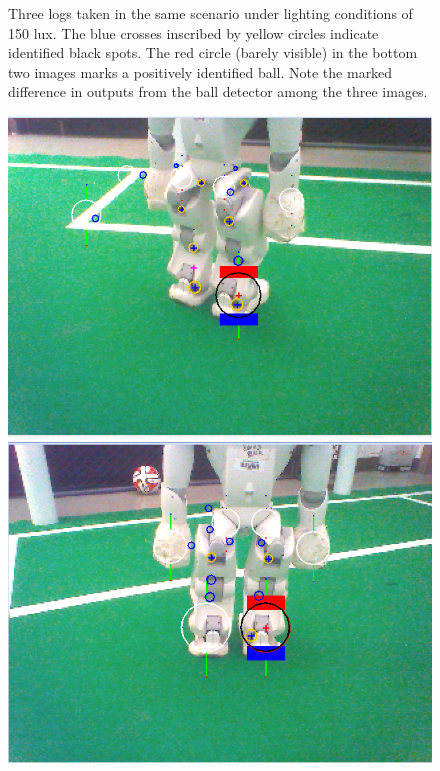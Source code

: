 \documentclass[11pt, twocolumn]{article}
\begin{document}
{\begin{figure}[h]
\caption{Three logs taken in the same scenario under lighting conditions of 150 lux. The blue crosses inscribed by yellow circles indicate identified black spots. The red circle (barely visible) in the bottom two images marks a positively identified ball. Note the marked difference in outputs from the ball detector among the three images.}
\label{fig:logs}
\end{figure}

\begin{figure}[h]
\centering
\includegraphics[scale=0.3]{fp1.png} \\
\includegraphics[scale=0.3]{fp2.png} \\

\end{figure}}
\end{document}
